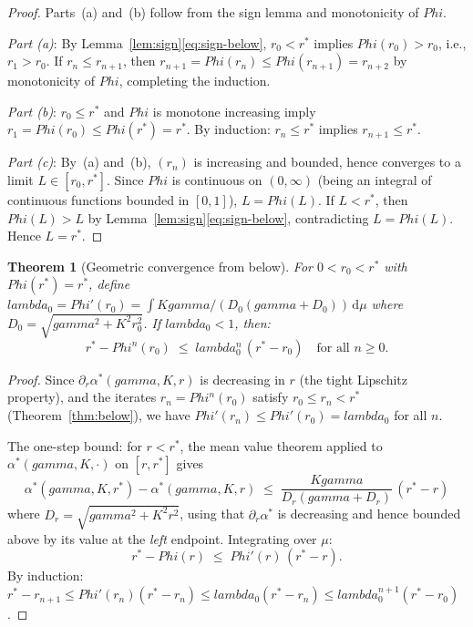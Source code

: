 \documentclass[11pt,a4paper]{article}
\let\Phi\relax\def\Phi{Phi}%
\let\lambda\relax\def\lambda{lambda}%
\let\gamma\relax\def\gamma{gamma}%
\newtheorem{theorem}{Theorem}[section]
\theoremstyle{definition}
\begin{document}
\begin{proof}
Parts~(a) and~(b) follow from the sign lemma and monotonicity of $\Phi$.

\emph{Part (a)}: By Lemma~\ref{lem:sign}\eqref{eq:sign-below}, $r_0 < r^*$ implies $\Phi(r_0) > r_0$, i.e., $r_1 > r_0$. If $r_n \leq r_{n+1}$, then $r_{n+1} = \Phi(r_n) \leq \Phi(r_{n+1}) = r_{n+2}$ by monotonicity of $\Phi$, completing the induction.

\emph{Part (b)}: $r_0 \leq r^*$ and $\Phi$ is monotone increasing imply $r_1 = \Phi(r_0) \leq \Phi(r^*) = r^*$. By induction: $r_n \leq r^*$ implies $r_{n+1} \leq r^*$.

\emph{Part (c)}: By~(a) and~(b), $(r_n)$ is increasing and bounded, hence converges to a limit $L \in [r_0, r^*]$. Since $\Phi$ is continuous on $(0,\infty)$ (being an integral of continuous functions bounded in $[0,1]$), $L = \Phi(L)$. If $L < r^*$, then $\Phi(L) > L$ by Lemma~\ref{lem:sign}\eqref{eq:sign-below}, contradicting $L = \Phi(L)$. Hence $L = r^*$.
\end{proof}

\begin{theorem}[Geometric convergence from below]\label{thm:geometric-below}
For $0 < r_0 < r^*$ with $\Phi(r^*) = r^*$, define $\lambda_0 = \Phi'(r_0) = \int K\gamma/(D_0(\gamma + D_0))\,\mathrm{d}\mu$ where $D_0 = \sqrt{\gamma^2 + K^2 r_0^2}$. If $\lambda_0 < 1$, then:
\begin{equation}\label{eq:geometric-below}
r^* - \Phi^n(r_0) \;\leq\; \lambda_0^n \,(r^* - r_0) \quad \text{for all } n \geq 0.
\end{equation}
\end{theorem}

\begin{proof}
Since $\partial_r\alpha^*(\gamma, K, r)$ is decreasing in $r$ (the tight Lipschitz property), and the iterates $r_n = \Phi^n(r_0)$ satisfy $r_0 \leq r_n < r^*$ (Theorem~\ref{thm:below}), we have $\Phi'(r_n) \leq \Phi'(r_0) = \lambda_0$ for all $n$.

The one-step bound: for $r < r^*$, the mean value theorem applied to $\alpha^*(\gamma, K, \cdot)$ on $[r, r^*]$ gives
\[
\alpha^*(\gamma, K, r^*) - \alpha^*(\gamma, K, r) \;\leq\; \frac{K\gamma}{D_r(\gamma + D_r)} \,(r^* - r)
\]
where $D_r = \sqrt{\gamma^2 + K^2 r^2}$, using that $\partial_r\alpha^*$ is decreasing and hence bounded above by its value at the \emph{left} endpoint. Integrating over $\mu$:
\[
r^* - \Phi(r) \;\leq\; \Phi'(r)\,(r^* - r).
\]
By induction: $r^* - r_{n+1} \leq \Phi'(r_n)(r^* - r_n) \leq \lambda_0(r^* - r_n) \leq \lambda_0^{n+1}(r^* - r_0)$.
\end{proof}
\end{document}
